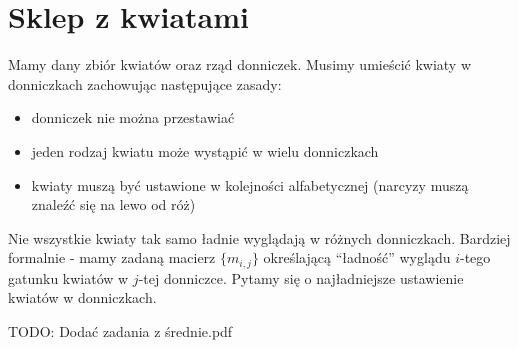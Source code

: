\section*{Sklep z kwiatami}

Mamy dany zbiór kwiatów oraz rząd donniczek.
Musimy umieścić kwiaty w donniczkach zachowując następujące zasady:
\begin{itemize}
 \item donniczek nie można przestawiać
 \item jeden rodzaj kwiatu może wystąpić w wielu donniczkach
 \item kwiaty muszą być ustawione w kolejności alfabetycznej (narcyzy muszą znaleźć się na lewo od róż)
\end{itemize}
Nie wszystkie kwiaty tak samo ładnie wyglądają w różnych donniczkach.
Bardziej formalnie - mamy zadaną macierz $\{m_{i,j}\}$ określającą ``ładność'' wyglądu $i$-tego gatunku kwiatów w $j$-tej donniczce.
Pytamy się o najładniejsze ustawienie kwiatów w donniczkach.

TODO: Dodać zadania z średnie.pdf